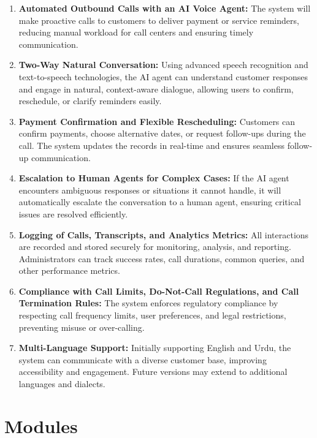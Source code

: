 \documentclass[12pt,a4paper]{report}
\begin{document}
\begin{enumerate}
    \item \textbf{Automated Outbound Calls with an AI Voice Agent:} The system will make proactive calls to customers to deliver payment or service reminders, reducing manual workload for call centers and ensuring timely communication.

    \item \textbf{Two-Way Natural Conversation:} Using advanced speech recognition and text-to-speech technologies, the AI agent can understand customer responses and engage in natural, context-aware dialogue, allowing users to confirm, reschedule, or clarify reminders easily.

    \item \textbf{Payment Confirmation and Flexible Rescheduling:} Customers can confirm payments, choose alternative dates, or request follow-ups during the call. The system updates the records in real-time and ensures seamless follow-up communication.

    \item \textbf{Escalation to Human Agents for Complex Cases:} If the AI agent encounters ambiguous responses or situations it cannot handle, it will automatically escalate the conversation to a human agent, ensuring critical issues are resolved efficiently.

    \item \textbf{Logging of Calls, Transcripts, and Analytics Metrics:} All interactions are recorded and stored securely for monitoring, analysis, and reporting. Administrators can track success rates, call durations, common queries, and other performance metrics.

    \item \textbf{Compliance with Call Limits, Do-Not-Call Regulations, and Call Termination Rules:} The system enforces regulatory compliance by respecting call frequency limits, user preferences, and legal restrictions, preventing misuse or over-calling.

    \item \textbf{Multi-Language Support:} Initially supporting English and Urdu, the system can communicate with a diverse customer base, improving accessibility and engagement. Future versions may extend to additional languages and dialects.
\end{enumerate}


\section{Modules}
\end{document}
